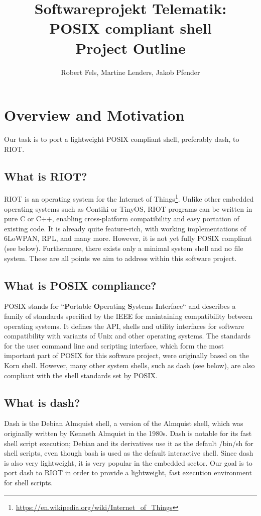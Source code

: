 \documentclass[11pt,
  a4paper,
  BCOR=7mm
]{scrartcl}
\author{Robert Fels, Martine Lenders, Jakob Pfender}
\title{Softwareprojekt Telematik:\\POSIX compliant shell\\Project Outline}
\begin{document}
\maketitle

\newpage

\section*{Overview and Motivation}
\label{sec:overview_motivation}
Our task is to port a lightweight POSIX compliant shell, preferably
dash, to RIOT.

\subsection*{What is RIOT?}
\label{sub:what_is_riot}
RIOT is an operating system for the Internet of
Things\footnote{\url{https://en.wikipedia.org/wiki/Internet_of_Things}}.
Unlike other embedded operating systems such as Contiki or TinyOS, RIOT
programs can be written in pure C or C++, enabling cross-platform
compatibility and easy portation of existing code. It is already quite
feature-rich, with working implementations of 6LoWPAN, RPL, and many
more. However, it is not yet fully POSIX compliant (see below).
Furthermore, there exists only a minimal system shell and no file
system. These are all points we aim to address within this software
project.

\subsection*{What is POSIX compliance?}
\label{sub:what_is_posix}
POSIX stands for ``\textbf{P}ortable \textbf{O}perating \textbf{S}ystems
\textbf{I}nterface`` and describes a family of standards specified by
the IEEE for maintaining compatibility between operating systems. It
defines the API, shells and utility interfaces for software
compatibility with variants of Unix and other operating systems. The
standards for the user command line and scripting interface, which form
the most important part of POSIX for this software project, were
originally based on the Korn shell. However, many other system shells,
such as dash (see below), are also compliant with the shell standards
set by POSIX.

\subsection*{What is dash?}
\label{sub:what_is_dash}
Dash is the Debian Almquist shell, a version of the Almquist shell,
which was originally written by Kenneth Almquist in the 1980s. Dash is
notable for its fast shell script execution; Debian and its derivatives
use it as the default /bin/sh for shell scripts, even though bash is
used as the default interactive shell. Since dash is also very
lightweight, it is very popular in the embedded sector. Our goal is to
port dash to RIOT in order to provide a lightweight, fast execution
environment for shell scripts.
\end{document}

